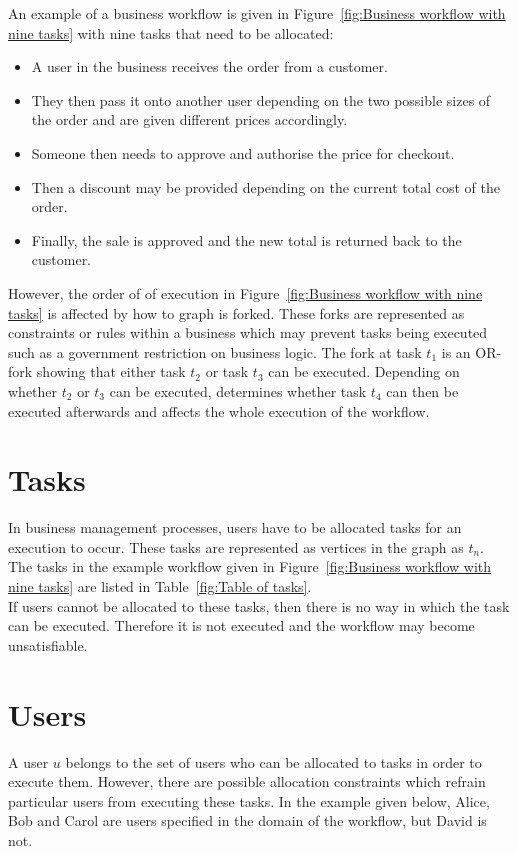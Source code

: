 \documentclass[a4paper]{report}
\begin{document}
An example of a business workflow is given in Figure~\ref{fig:Business workflow with nine tasks} with nine tasks that need to be allocated:
\begin{itemize}
\item A user in the business receives the order from a customer.
\item They then pass it onto another user depending on the two possible sizes of the order and are given different prices accordingly. 
\item Someone then needs to approve and authorise the price for checkout.
\item Then a discount may be provided depending on the current total cost of the order.
\item Finally, the sale is approved and the new total is returned back to the customer.
\end{itemize}

However, the order of of execution in Figure~\ref{fig:Business workflow with nine tasks} is affected by how to graph is forked. These forks are represented as constraints or rules within a business which may prevent tasks being executed such as a government restriction on business logic. The fork at task $t_{1}$ is an OR-fork showing that either task $t_{2}$ or task $t_{3}$ can be executed. Depending on whether $t_{2}$ or $t_{3}$ can be executed, determines whether task $t_{4}$ can then be executed afterwards and affects the whole execution of the workflow.  \\

\section{Tasks}
In business management processes, users have to be allocated tasks for an execution to occur. These tasks are represented as vertices in the graph as $t_{n}$. The tasks in the example workflow given in Figure~\ref{fig:Business workflow with nine tasks} are listed in Table~\ref{fig:Table of tasks}.\\

If users cannot be allocated to these tasks, then there is no way in which the task can be executed. Therefore it is not executed and the workflow may become unsatisfiable.\\

\section{Users}
A user $u$ belongs to the set of users who can be allocated to tasks in order to execute them. However, there are possible allocation constraints which refrain particular users from executing these tasks. In the example given below, Alice, Bob and Carol are users specified in the domain of the workflow, but David is not.\\
\begin{center}
\end{center}
\end{document}
